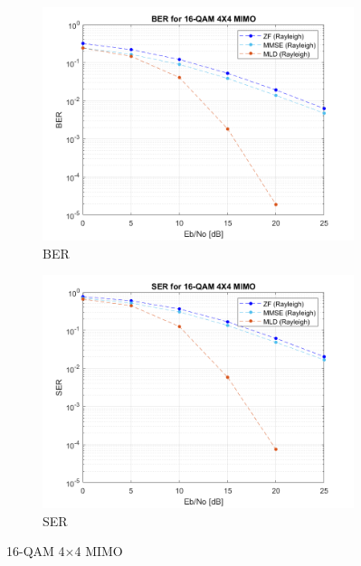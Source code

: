 \documentclass{article}
\begin{document}
\begin{figure}[H]
\begin{subfigure}{0.5\textwidth}
		\centerline{\includegraphics[width=1\textwidth]{d_Eb_BER.png}}
		\caption{BER}
	\end{subfigure}%
	\begin{subfigure}{0.5\textwidth}
		\centerline{\includegraphics[width=1\textwidth]{d_Eb_SER.png}}
		\caption{SER}
	\end{subfigure}%
	\caption{16-QAM 4$\times$4 MIMO}
\end{figure}
\newpage
\end{document}
